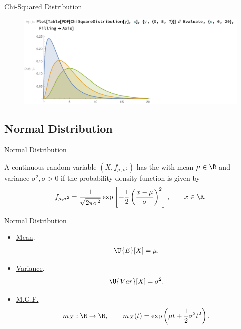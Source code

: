 \begin{frame}{Chi-Squared Distribution}

\begin{figure}[htbp]
	\centering
	\includegraphics[width=\linewidth]{./images/rc2fig4.pdf}
\end{figure}

\end{frame}


\subsection{Normal Distribution}

\begin{frame}{Normal Distribution}

\justifying
{} A continuous random variable $(X, f_{\mu, \sigma^2})$ has the  with mean $\mu \in \R$ and variance $\sigma^2, \sigma > 0$ if the probability density function is given by
\begin{align*}
f_{\mu, \sigma^2} = \frac{1}{\sqrt{2\pi \sigma^2}} \exp\left[-\frac{1}{2}\left(\frac{x-\mu}{\sigma} \right)^2 \right], \qquad x\in \R.
\end{align*}

\end{frame}

\begin{frame}{Normal Distribution}

\justifying
{} 
\begin{itemize}
	\justifying
	\item \underline{Mean}. 
	\begin{align*}
	\U{E}[X] = \mu.
	\end{align*}
	\item \underline{Variance}.
	\begin{align*}
	\U{Var}[X] = \sigma^2.
	\end{align*}
	\item \underline{M.G.F.}
	\begin{align*}
	m_X: \R \rightarrow \R, \qquad m_X(t) = \exp\left(\mu t + \frac{1}{2}\sigma^2t^2 \right).
	\end{align*}
\end{itemize}

\end{frame}

